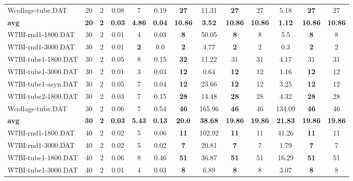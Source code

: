 \begin{table}[h]
{\begin{tabular}{lcccccccccccc}
Wcollage-tube.DAT & 20 & 2 &  \textcolor{blue2}{0.08} & 7 & 0.19 &  \textbf{27} & 11.31 &  \textbf{27} & 27 & 5.18 &  \textbf{27} & 27 \\
\cline{1-13} \textbf{avg} & \textbf{20} & \textbf{2} & \textbf{0.03} & \textbf{4.86} & \textbf{0.04} & \textbf{10.86} & \textbf{3.52} & \textbf{10.86} & \textbf{10.86} & \textbf{1.12} & \textbf{10.86} & \textbf{10.86} \\ \cline{1-13}
W7BI-rnd1-1800.DAT & 30 & 2 &  \textcolor{blue2}{0.01} & 4 & 0.03 &  \textbf{8} & 50.05 &  \textbf{8} & 8 & 5.5 &  \textbf{8} & 8 \\
W7BI-rnd1-3000.DAT & 30 & 2 & 0.01 &  \textbf{2} &  \textcolor{blue2}{0.0} &  \textbf{2} & 4.77 &  \textbf{2} & 2 & 0.3 &  \textbf{2} & 2 \\
W7BI-tube1-1800.DAT & 30 & 2 &  \textcolor{blue2}{0.05} & 8 & 0.15 &  \textbf{32} & 11.22 & 31 & 31 & 4.17 & 31 & 31 \\
W7BI-tube1-3000.DAT & 30 & 2 &  \textcolor{blue2}{0.01} & 3 & 0.03 &  \textbf{12} & 0.64 &  \textbf{12} & 12 & 1.16 &  \textbf{12} & 12 \\
W7BI-tube1-asyn.DAT & 30 & 2 & 0.05 & 7 &  \textcolor{blue2}{0.04} &  \textbf{12} & 23.66 &  \textbf{12} & 12 & 3.25 &  \textbf{12} & 12 \\
W7BI-tube2-1800.DAT & 30 & 2 &  \textcolor{blue2}{0.03} & 7 & 0.15 &  \textbf{28} & 14.48 &  \textbf{28} & 28 & 4.32 &  \textbf{28} & 28 \\
Wcollage-tube.DAT & 30 & 2 &  \textcolor{blue2}{0.06} & 7 & 0.54 &  \textbf{46} & 165.96 &  \textbf{46} & 46 & 134.09 &  \textbf{46} & 46 \\
\cline{1-13} \textbf{avg} & \textbf{30} & \textbf{2} & \textbf{0.03} & \textbf{5.43} & \textbf{0.13} & \textbf{20.0} & \textbf{38.68} & \textbf{19.86} & \textbf{19.86} & \textbf{21.83} & \textbf{19.86} & \textbf{19.86} \\ \cline{1-13}
W7BI-rnd1-1800.DAT & 40 & 2 &  \textcolor{blue2}{0.02} & 5 & 0.06 &  \textbf{11} & 102.92 &  \textbf{11} & 11 & 41.26 &  \textbf{11} & 11 \\
W7BI-rnd1-3000.DAT & 40 & 2 &  \textcolor{blue2}{0.02} & 5 &  \textcolor{blue2}{0.02} &  \textbf{7} & 20.81 &  \textbf{7} & 7 & 1.79 &  \textbf{7} & 7 \\
W7BI-tube1-1800.DAT & 40 & 2 &  \textcolor{blue2}{0.06} & 8 & 0.46 &  \textbf{51} & 36.87 &  \textbf{51} & 51 & 16.29 &  \textbf{51} & 51 \\
W7BI-tube1-3000.DAT & 40 & 2 &  \textcolor{blue2}{0.01} & 4 & 0.03 &  \textbf{8} & 6.89 &  \textbf{8} & 8 & 3.07 &  \textbf{8} & 8 \\

\end{tabular}}
\end{table}
